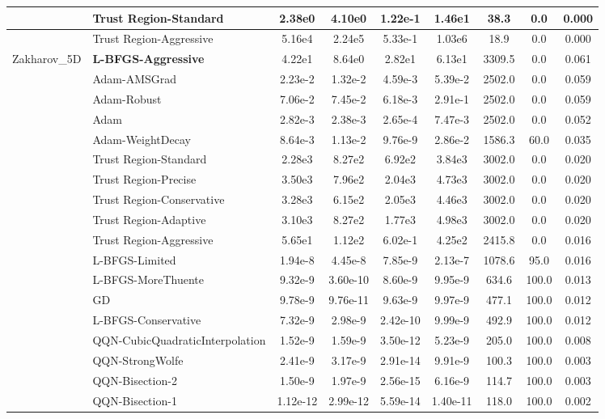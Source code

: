 \documentclass[10pt]{article}
\begin{document}
\begin{longtable}{|l|l|c|c|c|c|c|c|c|}
\hline
 & Trust Region-Standard & 2.38e0 & 4.10e0 & 1.22e-1 & 1.46e1 & 38.3 & 0.0 & 0.000 \\
\hline
 & Trust Region-Aggressive & 5.16e4 & 2.24e5 & 5.33e-1 & 1.03e6 & 18.9 & 0.0 & 0.000 \\
Zakharov\_5D & \textbf{L-BFGS-Aggressive} & 4.22e1 & 8.64e0 & 2.82e1 & 6.13e1 & 3309.5 & 0.0 & 0.061 \\
\hline
 & Adam-AMSGrad & 2.23e-2 & 1.32e-2 & 4.59e-3 & 5.39e-2 & 2502.0 & 0.0 & 0.059 \\
\hline
 & Adam-Robust & 7.06e-2 & 7.45e-2 & 6.18e-3 & 2.91e-1 & 2502.0 & 0.0 & 0.059 \\
\hline
 & Adam & 2.82e-3 & 2.38e-3 & 2.65e-4 & 7.47e-3 & 2502.0 & 0.0 & 0.052 \\
\hline
 & Adam-WeightDecay & 8.64e-3 & 1.13e-2 & 9.76e-9 & 2.86e-2 & 1586.3 & 60.0 & 0.035 \\
\hline
 & Trust Region-Standard & 2.28e3 & 8.27e2 & 6.92e2 & 3.84e3 & 3002.0 & 0.0 & 0.020 \\
\hline
 & Trust Region-Precise & 3.50e3 & 7.96e2 & 2.04e3 & 4.73e3 & 3002.0 & 0.0 & 0.020 \\
\hline
 & Trust Region-Conservative & 3.28e3 & 6.15e2 & 2.05e3 & 4.46e3 & 3002.0 & 0.0 & 0.020 \\
\hline
 & Trust Region-Adaptive & 3.10e3 & 8.27e2 & 1.77e3 & 4.98e3 & 3002.0 & 0.0 & 0.020 \\
\hline
 & Trust Region-Aggressive & 5.65e1 & 1.12e2 & 6.02e-1 & 4.25e2 & 2415.8 & 0.0 & 0.016 \\
\hline
 & L-BFGS-Limited & 1.94e-8 & 4.45e-8 & 7.85e-9 & 2.13e-7 & 1078.6 & 95.0 & 0.016 \\
\hline
 & L-BFGS-MoreThuente & 9.32e-9 & 3.60e-10 & 8.60e-9 & 9.95e-9 & 634.6 & 100.0 & 0.013 \\
\hline
 & GD & 9.78e-9 & 9.76e-11 & 9.63e-9 & 9.97e-9 & 477.1 & 100.0 & 0.012 \\
\hline
 & L-BFGS-Conservative & 7.32e-9 & 2.98e-9 & 2.42e-10 & 9.99e-9 & 492.9 & 100.0 & 0.012 \\
\hline
 & QQN-CubicQuadraticInterpolation & 1.52e-9 & 1.59e-9 & 3.50e-12 & 5.23e-9 & 205.0 & 100.0 & 0.008 \\
\hline
 & QQN-StrongWolfe & 2.41e-9 & 3.17e-9 & 2.91e-14 & 9.91e-9 & 100.3 & 100.0 & 0.003 \\
\hline
 & QQN-Bisection-2 & 1.50e-9 & 1.97e-9 & 2.56e-15 & 6.16e-9 & 114.7 & 100.0 & 0.003 \\
\hline
 & QQN-Bisection-1 & 1.12e-12 & 2.99e-12 & 5.59e-14 & 1.40e-11 & 118.0 & 100.0 & 0.002 \\

\end{longtable}
\end{document}
